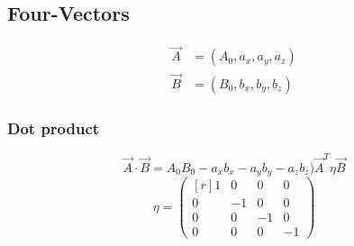 \subsection{Four-Vectors}
\begin{align}
    \vec{A} &= (A_0, a_x, a_y, a_z) \\
    \vec{B} &= (B_0, b_x, b_y, b_z)
\end{align}
\subsubsection{Dot product}
\begin{equation}
  \vec{A} ⋅ \vec{B} = A_0B_0 - a_xb_x - a_yb_y - a_zb_z ) \vec{A}^{T} η \vec{B}
\end{equation}
\begin{equation}
  η = 
    \begin{pmatrix*}[r]
    1 & 0 & 0 & 0 \\
    0 & -1 & 0 & 0 \\
    0 & 0 & -1 & 0 \\
    0 & 0 & 0 & -1
    \end{pmatrix*}
\end{equation}
